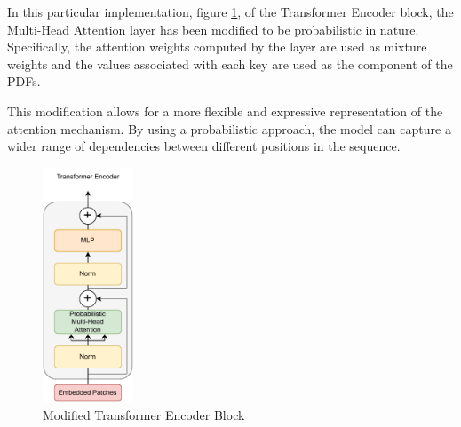 In this particular implementation, figure \ref{fig:TransformereNCODER}, of the Transformer Encoder block, the Multi-Head Attention layer has been modified to be probabilistic in nature. Specifically, the attention weights computed by the layer are used as mixture weights and the values associated with each key are used as the component of the PDFs.

This modification allows for a more flexible and expressive representation of the attention mechanism. By using a probabilistic approach, the model can capture a wider range of dependencies between different positions in the sequence.
    \begin{figure}[htp]
        \centering
        \includegraphics[height=7cm]{images/Transformer Encoder.drawio.pdf}
        \caption{Modified Transformer Encoder Block}
        \label{fig:TransformereNCODER}
    \end{figure}
